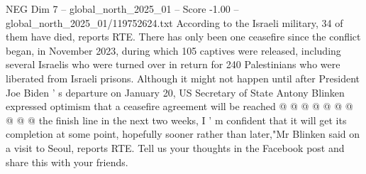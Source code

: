 \begin{textsample}{NEG Dim 7 – global\_north\_2025\_01 – Score -1.00 – global\_north\_2025\_01/119752624.txt}
According to the Israeli military, 34 of them have died, reports RTE.
There has only been one ceasefire since the conflict began, in November 2023, during which 105 captives were released, including several Israelis who were turned over in return for 240 Palestinians who were liberated from Israeli prisons.
Although it might not happen until after President Joe Biden ' s departure on January 20, US Secretary of State Antony Blinken expressed optimism that a ceasefire agreement will be reached @ @ @ @ @ @ @ @ @ @ the finish line in the next two weeks, I ' m confident that it will get its completion at some point, hopefully sooner rather than later,"Mr Blinken said on a visit to Seoul, reports RTE.
Tell us your thoughts in the Facebook post and share this with your friends.

\end{textsample}
